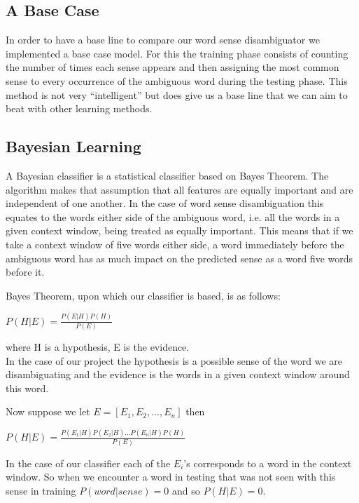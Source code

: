 \documentclass[a4wide,10pt]{article}
\begin{document}
\subsection{A Base Case}
In order to have a base line to compare our word sense disambiguator we
implemented a base case model.
For this the training phase consists of counting the number of times each
sense appears and then assigning the most common sense to every occurrence
of the ambiguous word during the testing phase.
This method is not very ``intelligent'' but does give us a base line that 
we can aim to beat with other learning methods.


\subsection{Bayesian Learning}
        A Bayesian classifier is a statistical classifier based on Bayes                Theorem.  The algorithm makes that assumption that all features are
        equally important and are independent of one another.
        In the case of word sense disambiguation this equates to the words
        either side of the ambiguous word, i.e. all the words in a given
        context window, being treated as equally important. This means that if
        we take a context window of five words either side, a word immediately
        before the ambiguous word has as much impact on the predicted sense
        as a word five words before it.


        Bayes Theorem, upon which our classifier is based, is as follows:\\
        \begin{center}
        $ P(H|E) = \frac{P(E|H)P(H)} {P(E)} $\\
        \end{center}
        where H is a hypothesis, E is the evidence.\\
        In the case of our project the hypothesis is a possible sense of the
        word we are disambiguating and the evidence is the words in a given
        context window around this word.

 Now suppose we let $E = [E_1, E_2, \ldots, E_n]$ then \\
        \begin{center}
        $P(H|E) = \frac{P(E_1|H)P(E_2|H)...P(E_n|H)P(H)}{P(E)}$\\
        \end{center}
        In the case of our classifier each of the $E_i$'s corresponds
        to a word in the context window.
        So when we encounter a word in testing that was not seen
        with this sense in training $P(word|sense) = 0$ and so
        $P(H|E) = 0$.
\end{document}
